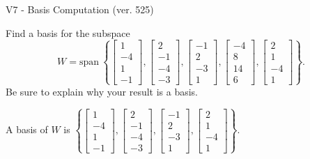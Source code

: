 \begin{exercise}
  \begin{exerciseTitle}V7 - Basis Computation (ver. 525)\end{exerciseTitle}
  \begin{exerciseStatement}
    Find a basis for the subspace 
\[W=\mathrm{span}\ \left\{\left[\begin{array}{r}
1 \\
-4 \\
1 \\
-1
\end{array}\right] , \left[\begin{array}{r}
2 \\
-1 \\
-4 \\
-3
\end{array}\right] , \left[\begin{array}{r}
-1 \\
2 \\
-3 \\
1
\end{array}\right] , \left[\begin{array}{r}
-4 \\
8 \\
14 \\
6
\end{array}\right] , \left[\begin{array}{r}
2 \\
1 \\
-4 \\
1
\end{array}\right]\right\}.\]
 Be sure to explain why your result is a basis.


  \end{exerciseStatement}
  \begin{exerciseAnswer}
   A basis of \(W\) is  \(\left\{\left[\begin{array}{r}
1 \\
-4 \\
1 \\
-1
\end{array}\right] , \left[\begin{array}{r}
2 \\
-1 \\
-4 \\
-3
\end{array}\right] , \left[\begin{array}{r}
-1 \\
2 \\
-3 \\
1
\end{array}\right] , \left[\begin{array}{r}
2 \\
1 \\
-4 \\
1
\end{array}\right]\right\}\).
  


  \end{exerciseAnswer}
\end{exercise}